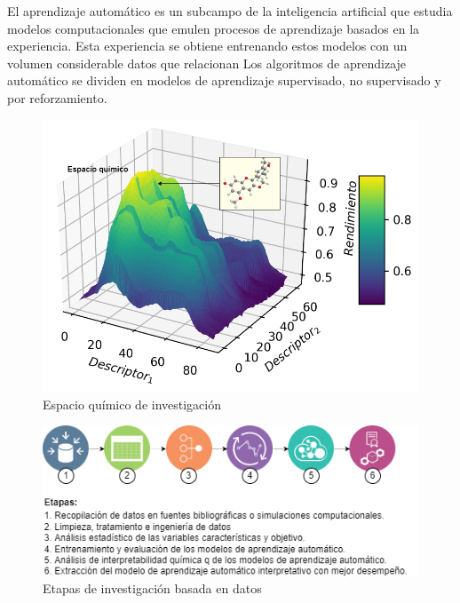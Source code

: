 El aprendizaje automático es un subcampo de la inteligencia artificial que estudia modelos computacionales que emulen procesos de aprendizaje basados en la experiencia. Esta experiencia se obtiene entrenando estos modelos con un volumen considerable datos que relacionan  Los algoritmos de aprendizaje automático se dividen en modelos de aprendizaje supervisado, no supervisado y por reforzamiento. 




\begin{figure}[h!]
    \begin{center}
        \includegraphics[scale=0.45]{img/espacioquimico.png}
    \end{center}
    \label{img:espacioquimico}
    \caption{Espacio químico de investigación}
\end{figure}

\begin{figure}[h!]
    \begin{center}
        \includegraphics[scale=0.7]{img/etapas.png}
    \end{center}
    \label{img:etapas}
    \caption{Etapas de investigación basada en datos}
\end{figure}
